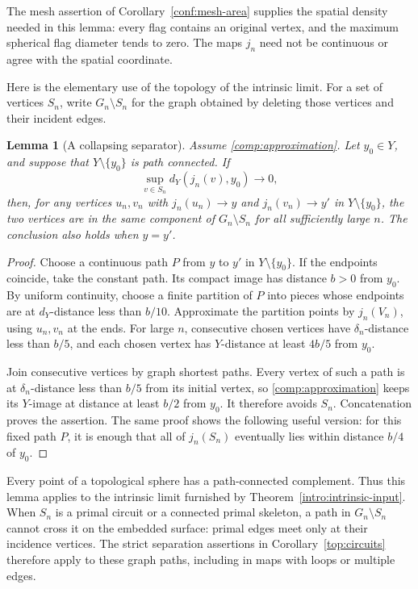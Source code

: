 \documentclass[11pt]{article}
\numberwithin{equation}{section}
\newtheorem{lemma}[theorem]{Lemma}
\theoremstyle{definition}
\theoremstyle{remark}
\newcommand{\1}{\mathbf 1}
\begin{document}
The mesh assertion of Corollary~\ref{conf:mesh-area} supplies the
spatial density needed in this lemma: every flag contains an original
vertex, and the maximum spherical flag diameter tends to zero.  The
maps $j_n$ need not be continuous or agree with the spatial coordinate.

Here is the elementary use of the topology of the intrinsic limit.
For a set of vertices $S_n$, write $G_n\setminus S_n$ for the graph
obtained by deleting those vertices and their incident edges.

\begin{lemma}[A collapsing separator]
\label{comp:avoid-separator}
Assume \eqref{comp:approximation}.  Let $y_0\in Y$, and suppose that
$Y\setminus\{y_0\}$ is path connected.  If
\[
 \sup_{v\in S_n}d_Y(j_n(v),y_0)\longrightarrow0,
\]
then, for any vertices $u_n,v_n$ with
$j_n(u_n)\to y$ and $j_n(v_n)\to y'$ in
$Y\setminus\{y_0\}$, the two vertices are in the same component of
$G_n\setminus S_n$ for all sufficiently large $n$.
The conclusion also holds when $y=y'$.
\end{lemma}

\begin{proof}
Choose a continuous path $P$ from $y$ to $y'$ in
$Y\setminus\{y_0\}$.  If the endpoints coincide, take the constant
path.  Its compact image has distance $b>0$ from $y_0$.  By uniform
continuity, choose a finite partition of $P$ into pieces whose
endpoints are at $d_Y$-distance less than $b/10$.  Approximate the
partition points by $j_n(V_n)$, using $u_n,v_n$ at the ends.  For large
$n$, consecutive chosen vertices have $\delta_n$-distance less than
$b/5$, and each chosen vertex has $Y$-distance at least $4b/5$ from
$y_0$.

Join consecutive vertices by graph shortest paths.  Every vertex of
such a path is at $\delta_n$-distance less than $b/5$ from its initial
vertex, so \eqref{comp:approximation} keeps its $Y$-image at distance
at least $b/2$ from $y_0$.  It therefore avoids $S_n$.  Concatenation
proves the assertion.  The same proof shows the following useful
version: for this fixed path $P$, it is enough that all of $j_n(S_n)$
eventually lies within distance $b/4$ of $y_0$.
\end{proof}

Every point of a topological sphere has a path-connected complement.
Thus this lemma applies to the intrinsic limit furnished by
Theorem~\ref{intro:intrinsic-input}.  When $S_n$ is a primal circuit
or a connected primal skeleton, a path in $G_n\setminus S_n$ cannot
cross it on the embedded surface: primal edges meet only at their
incidence vertices.  The strict separation assertions in
Corollary~\ref{top:circuits} therefore apply to these graph paths,
including in maps with loops or multiple edges.
\end{document}
